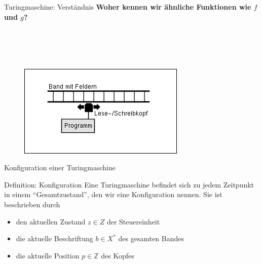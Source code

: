 \begin{frame}{Turingmaschine: Verständnis}
    \textbf{Woher kennen wir ähnliche Funktionen wie $f$ und $g$?}\\
    \pause
    \\
    \pause
    \\
    \pause
    \\
    \pause
    \\
    \pause
    \begin{figure}
        \includegraphics[scale=0.6]{graphics/12/Turingmaschine.png}
    \end{figure}
\end{frame}


\begin{frame}{Konfiguration einer Turingmaschine}
    \begin{block}{Definition: Konfiguration}
        Eine Turingmaschine befindet sich zu jedem Zeitpunkt in einem ``Gesamtzustand'', den wir eine Konfiguration nennen. Sie ist beschrieben durch
        \begin{itemize}
            \item den aktuellen Zustand $z \in Z$ der Steuereinheit
            \item die aktuelle Beschriftung $b\in X^*$ des gesamten Bandes
            \item die aktuelle Position $p \in \mathbb{Z}$ des Kopfes
        \end{itemize}
    \end{block}
\end{frame}


